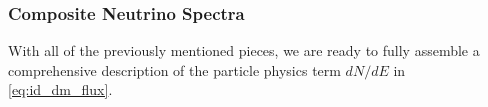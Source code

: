 \subsubsection{Composite Neutrino Spectra}\label{sec:icDM_composite_dNdE}

With all of the previously mentioned pieces, we are ready to fully assemble a comprehensive description of the particle physics term $dN/dE$ in \cref{eq:id_dm_flux}.
\nuIDDMFlux

\begin{figure}[t]
\end{figure}
